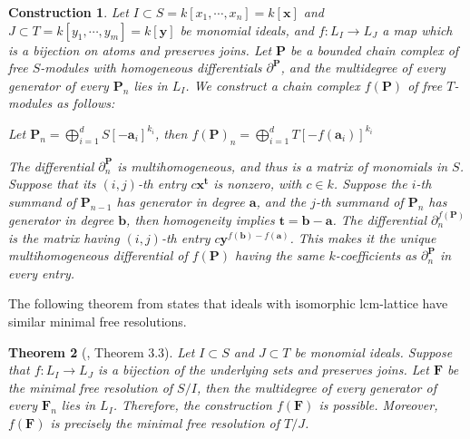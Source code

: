 \documentclass[dvipsnames,10pt]{article}
\newtheorem{theorem}{Theorem}[section]
\newtheorem{construction}[theorem]{Construction}
\begin{document}
\begin{construction}

Let $I\subset S=k[x_1,\cdots,x_n]=k[\mathbf{x}]$ and $J\subset T=k[y_1,\cdots,y_m]=k[\mathbf{y}]$ be monomial ideals, and $f:L_I\to L_J$ a map which is a bijection on atoms and preserves joins. Let $\mathbf{P}$ be a bounded chain complex of free $S$-modules with homogeneous differentials $\partial^\mathbf{P}$, and the multidegree of every generator of every $\mathbf{P}_n$ lies in $L_I$. We construct a chain complex $f(\mathbf{P})$ of free $T$-modules as follows:

Let $\mathbf{P}_n=\bigoplus_{i=1}^{d} S[-\mathbf{a}_i]^{k_i}$, then $f(\mathbf{P})_n=\bigoplus_{i=1}^{d} T[-f(\mathbf{a}_i)]^{k_i}$

The differential $\partial^\mathbf{P}_n$ is multihomogeneous, and thus is a matrix of monomials in $S$. Suppose that its $(i,j)$-th entry $c \mathbf{x}^\mathbf{t}$ is nonzero, with $c\in k$. Suppose the $i$-th summand of $\mathbf{P}_{n-1}$ has generator in degree $\mathbf{a}$, and the $j$-th summand of $\mathbf{P}_n$ has generator in degree $\mathbf{b}$, then homogeneity implies $\mathbf{t} = \mathbf{b} - \mathbf{a}$. The differential $\partial^{f(\mathbf{P})}_n$ is the matrix having $(i,j)$-th entry $c \mathbf{y}^{f(\mathbf{b}) - f(\mathbf{a})}$. This makes it the unique multihomogeneous differential of $f(\mathbf{P})$ having the same $k$-coefficients as $\partial^\mathbf{P}_n$ in every entry.

\end{construction}

The following theorem from \cite{welker1999lcm} states that ideals with isomorphic lcm-lattice have similar minimal free resolutions.

\begin{theorem}[\cite{welker1999lcm}, Theorem 3.3]
    Let $I\subset S$ and $J\subset T$ be monomial ideals. Suppose that $f:L_I\to L_J$ is a bijection of the underlying sets and preserves joins. Let $\mathbf{F}$ be the minimal free resolution of $S/I$, then the multidegree of every generator of every $\mathbf{F}_n$ lies in $L_I$. Therefore, the construction $f(\mathbf{F})$ is possible. Moreover, $f(\mathbf{F})$ is precisely the minimal free resolution of $T/J$.
\end{theorem}
\end{document}
